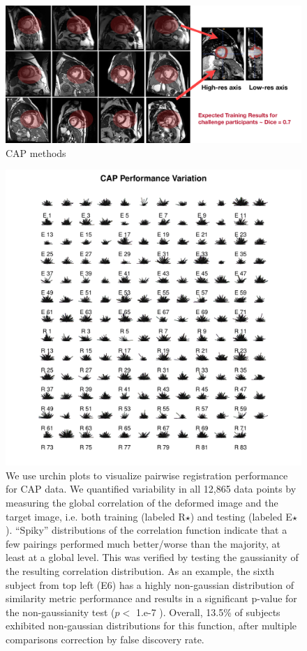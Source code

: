\documentclass{llncs}
\begin{document}
\begin{figure}[t]
 \centering 
  \includegraphics[width=5in]{../figs/CAP_methods.pdf}
 \caption{CAP methods}
 \label{fig:CAPmethods}
\end{figure}

\begin{figure}[t]
 \centering 
  \includegraphics[width=5in]{../figs/spider_CAP.pdf}
 \caption{We use urchin plots to visualize pairwise registration
   performance for CAP data.  We quantified variability in
   all 12,865 data points by measuring
   the global correlation of the deformed image and the target image,
   i.e. both training (labeled R$\star$) and testing (labeled E$\star$). ``Spiky''
   distributions of the correlation function indicate that
 a few pairings performed much better/worse than the majority, at
 least at a global level.  This
 was verified by testing the gaussianity of the resulting correlation
 distribution.  As an example, the sixth subject from top left (E6) has a
 highly non-gaussian distribution of similarity metric performance and
results in a significant p-value for the non-gaussianity test ($p <$
1.e-7 ).  Overall, 13.5\% of subjects exhibited non-gaussian
distributions for this function, after multiple comparisons correction by false discovery rate.}
 \label{fig:CAPvar}
\end{figure}
\end{document}

